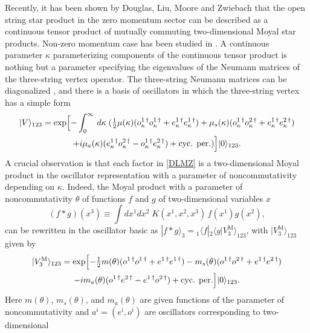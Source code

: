 \documentclass[a4paper,12pt]{article}
\begin{document}
Recently, it has been shown by Douglas, Liu, Moore
and Zwiebach \cite{0202087} that the open string star product
in the zero momentum sector
can be described as a continuous tensor product of
mutually commuting two-dimensional Moyal star products.
Non-zero momentum case has been studied in \cite{0204164}.
A continuous parameter $\kappa$
parameterizing components of the continuous tensor product
is nothing but a parameter specifying the eigenvalues of the Neumann
matrices of the three-string vertex operator.
The three-string Neumann matrices
can be diagonalized \cite{0111281}, \cite{0201015}
and there is a basis of oscillators \cite{0202087}
in which the three-string vertex has a simple form
\begin{multline}
|V\rangle_{123}=\exp\Bigl[-\int_{0}^{\infty}\,d\kappa\;
(\tfrac12\mu(\kappa)(o_{\kappa}^{1\,\dagger}o_{\kappa}^{1\,\dagger}
+e_{\kappa}^{1\,\dagger}e_{\kappa}^{1\,\dagger})
+ \mu_s(\kappa)(o_{\kappa}^{1\,\dagger}o_{\kappa}^{2\,\dagger}
+e_{\kappa}^{1\,\dagger} e_{\kappa}^{2\,\dagger})\\
+i\mu_{a}(\kappa)(e_{\kappa}^{1\,\dagger}o_{\kappa}^{2\,\dagger}
-o_{\kappa}^{1\,\dagger} e_{\kappa}^{2\,\dagger})
+ \text{cyc. per.})\Bigr]|0\rangle_{123}.
\label{DLMZ}
\end{multline}
A crucial observation \cite{0202087} is that each factor in \eqref{DLMZ}
is a two-dimensional Moyal product in the oscillator representation
with a parameter of noncommutativity depending on $\kappa$.
Indeed, the Moyal product with a
parameter of noncommutativity $\theta$ of functions
$f$ and $g$ of two-dimensional variables $x$
\begin{equation*}
(f * g)(x^{3}) \equiv \int dx^{1} dx^{2} \;
K(x^{1},x^{2},x^{3})\, f(x^{1}) g(x^{2}),
\end{equation*}
can be rewritten in the oscillator basic as
$|f*g\rangle_3={}_{1}\langle f|{}_{2}\langle g|V^{\text{M}}_{3}\rangle_{123}$,
with $|V^{\text{M}}_3\rangle_{123}$ given by
\begin{multline}
|V^{\text{M}}_3\rangle_{123}=\exp\Bigl[ -\tfrac12 m(\theta)
(o^{1\,\dag}o^{1\,\dag}+e^{1\,\dag}e^{1\,\dag})
-m_s(\theta)(o^{1\,\dag}o^{2\,\dag}+e^{1\,\dag}e^{2\,\dag})\\
-im_a(\theta)(o^{1\,\dag}e^{2\,\dag}-e^{1\,\dag}o^{2\,\dag})
+\hbox{cyc. per.}\Bigr] |0\rangle_{123}.
\label{MV}
\end{multline}
Here $m(\theta)$, $m_s(\theta)$, and $m_a(\theta)$ are given
functions of the parameter of noncommutativity
and $a^i=(e^i,o^i)$ are oscillators corresponding to two-dimensional
\end{document}
